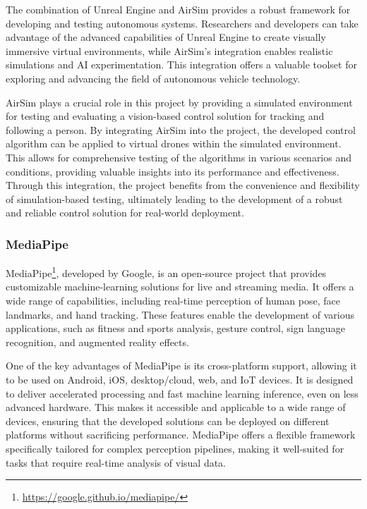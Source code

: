 The combination of Unreal Engine and AirSim provides a robust framework for developing and testing autonomous systems. Researchers and developers can take advantage of the advanced capabilities of Unreal Engine to create visually immersive virtual environments, while AirSim's integration enables realistic simulations and AI experimentation. This integration offers a valuable toolset for exploring and advancing the field of autonomous vehicle technology.

AirSim plays a crucial role in this project by providing a simulated environment for testing and evaluating a vision-based control solution for tracking and following a person. By integrating AirSim into the project, the developed control algorithm can be applied to virtual drones within the simulated environment. This allows for comprehensive testing of the algorithms in various scenarios and conditions, providing valuable insights into its performance and effectiveness. Through this integration, the project benefits from the convenience and flexibility of simulation-based testing, ultimately leading to the development of a robust and reliable control solution for real-world deployment.


\subsubsection{MediaPipe}
\label{subsec:mediapipe}
MediaPipe\footnote{\url{https://google.github.io/mediapipe/}}, developed by Google, is an open-source project that provides customizable machine-learning solutions for live and streaming media. It offers a wide range of capabilities, including real-time perception of human pose, face landmarks, and hand tracking. These features enable the development of various applications, such as fitness and sports analysis, gesture control, sign language recognition, and augmented reality effects.

One of the key advantages of MediaPipe is its cross-platform support, allowing it to be used on Android, iOS, desktop/cloud, web, and IoT devices. It is designed to deliver accelerated processing and fast machine learning inference, even on less advanced hardware. This makes it accessible and applicable to a wide range of devices, ensuring that the developed solutions can be deployed on different platforms without sacrificing performance.
MediaPipe offers a flexible framework specifically tailored for complex perception pipelines, making it well-suited for tasks that require real-time analysis of visual data. 

